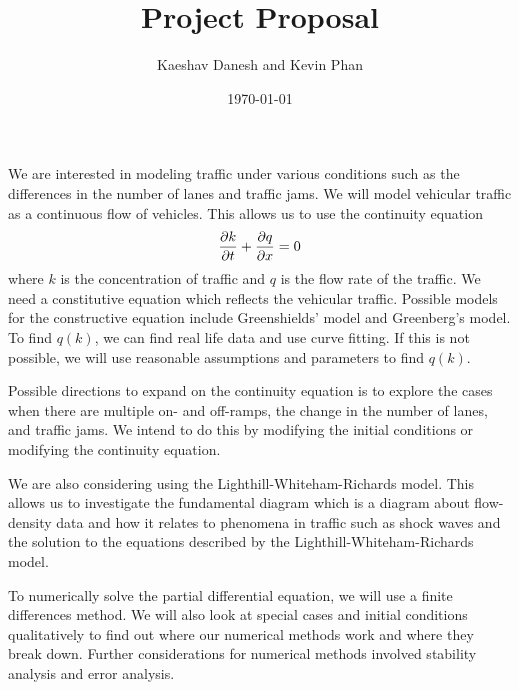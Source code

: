 \documentclass[12pt]{article}
\title{Project Proposal}
\author{Kaeshav Danesh and Kevin Phan}
\date{\today}
\begin{document}
	
	\maketitle
    
    
    We are interested in modeling traffic under various conditions such as the differences in the number of lanes and traffic jams. We will model vehicular traffic as a continuous flow of vehicles. This allows us to use the continuity equation 
    \begin{equation}
        \pdv{k}{t} + \pdv{q}{x} = 0
    \end{equation}
    where $k$ is the concentration of traffic and $q$ is the flow rate of the traffic. We need a constitutive equation which reflects the vehicular traffic. Possible models for the constructive equation include Greenshields' model and Greenberg's model. To find $q(k)$, we can find real life data and use curve fitting. If this is not possible, we will use reasonable assumptions and parameters to find $q(k)$. 
    
    Possible directions to expand on the continuity equation is to explore the cases when there are multiple on- and off-ramps, the change in the number of lanes, and traffic jams. We intend to do this by modifying the initial conditions or modifying the continuity equation. 
    
    We are also considering using the Lighthill-Whiteham-Richards model. This allows us to investigate the fundamental diagram which is a diagram about flow-density data and how it relates to phenomena in traffic such as shock waves and the solution to the equations described by the Lighthill-Whiteham-Richards model.

    To numerically solve the partial differential equation, we will use a finite differences method. We will also look at special cases and initial conditions qualitatively to find out where our numerical methods work and where they break down. Further considerations for numerical methods involved stability analysis and error analysis. 
\end{document}
